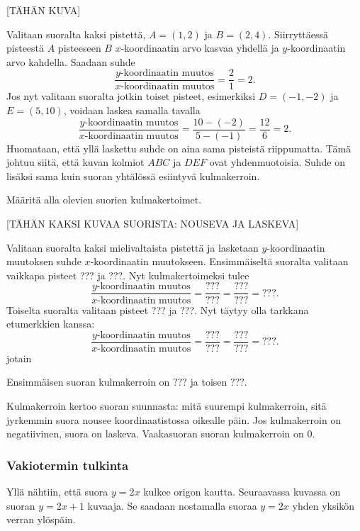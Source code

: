 [TÄHÄN KUVA]

Valitaan suoralta kaksi pistettä,
$A=(1,2)$ ja $B=(2,4)$. Siirryttäessä pisteestä $A$ pisteeseen $B$ $x$-koordinaatin arvo kasvaa yhdellä ja $y$-koordinaatin arvo kahdella. Saadaan suhde
\[
\frac{\text{$y$-koordinaatin muutos}}{\text{$x$-koordinaatin muutos}}=\frac{2}{1}=2.
\]
Jos nyt valitaan suoralta jotkin toiset pisteet, esimerkiksi $D=(-1,-2)$ ja $E=(5,10)$, voidaan laskea samalla tavalla
\[
\frac{\text{$y$-koordinaatin muutos}}{\text{$x$-koordinaatin muutos}}=\frac{10-(-2)}{5-(-1)}=\frac{12}{6}=2.
\]
Huomataan, että yllä laskettu suhde on aina sama pisteistä riippumatta. Tämä johtuu siitä, että kuvan kolmiot $ABC$ ja $DEF$ ovat yhdenmuotoisia.
Suhde on lisäksi sama kuin suoran yhtälössä esiintyvä kulmakerroin.

\begin{esimerkki} Määritä alla olevien suorien kulmakertoimet.

[TÄHÄN KAKSI KUVAA SUORISTA: NOUSEVA JA LASKEVA]
\begin{esimratk} Valitaan suoralta kaksi mielivaltaista pistettä ja lasketaan $y$-koordinaatin muutoksen suhde $x$-koordinaatin muutokseen.
Ensimmäiseltä suoralta valitaan vaikkapa pisteet ??? ja ???. Nyt kulmakertoimeksi tulee
\[
\frac{\text{$y$-koordinaatin muutos}}{\text{$x$-koordinaatin muutos}}=\frac{???}{???}=\frac{???}{???}=???.
\]
Toiselta suoralta valitaan pisteet ??? ja ???. Nyt täytyy olla tarkkana etumerkkien kanssa:
\[
\frac{\text{$y$-koordinaatin muutos}}{\text{$x$-koordinaatin muutos}}=\frac{???}{???}=\frac{???}{???}=???.
\]
jotain
\end{esimratk}
\begin{esimvast}
Ensimmäisen suoran kulmakerroin on $???$ ja toisen $???$.
\end{esimvast}
\end{esimerkki}

Kulmakerroin kertoo suoran suunnasta: mitä suurempi kulmakerroin, sitä jyrkemmin suora nousee koordinaatistossa oikealle päin.
Jos kulmakerroin on negatiivinen, suora on laskeva. Vaakasuoran suoran kulmakerroin on 0.

\subsubsection*{Vakiotermin tulkinta}

Yllä nähtiin, että suora $y=2x$ kulkee origon kautta. Seuraavassa kuvassa on suoran $y=2x+1$ kuvaaja. Se saadaan nostamalla suoraa $y=2x$ yhden yksikön verran ylöspäin.

